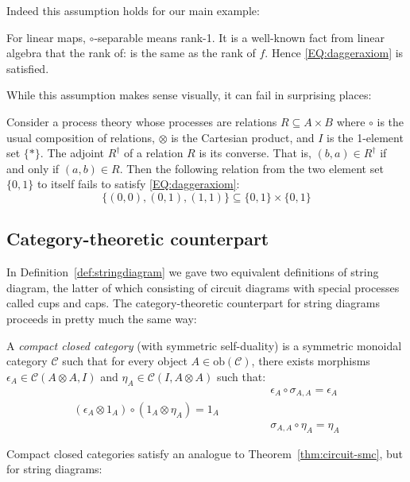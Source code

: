 \documentclass[12pt]{article}
\begin{document}
Indeed this assumption holds for our main example:
\begin{example}
  For linear maps, $\circ$-separable means rank-1. It is a well-known fact from linear algebra that the rank of:
  is the same as the rank of $f$. Hence \eqref{EQ:daggeraxiom} is satisfied.
\end{example}

While this assumption makes sense visually, it can fail in surprising places:
\begin{example}
  Consider a process theory whose processes are relations $R \subseteq A \times B$ where $\circ$ is the usual composition of relations, $\otimes$ is the Cartesian product, and $I$ is the 1-element set $\{ * \}$. The adjoint $R^\dagger$ of a relation $R$ is its converse. That is, $(b,a) \in R^\dagger$ if and only if $(a,b) \in R$. Then the following relation from the two element set $\{0,1\}$ to itself fails to satisfy \eqref{EQ:daggeraxiom}:
  \[ 
  \{ (0,0), (0,1), (1,1) \} \subseteq \{0,1\} \times \{0,1\} 
  \]
\end{example}

\subsection{Category-theoretic counterpart}

In Definition~\ref{def:stringdiagram} we gave two equivalent definitions 
of string diagram, the latter of which consisting of circuit diagrams with special processes called cups and caps. The category-theoretic counterpart for string diagrams proceeds in pretty much the same way:

\begin{definition}\label{def:compact-closed}
  A \textit{compact closed category} (with symmetric self-duality) is a symmetric monoidal category $\mathcal C$ such that for every object $A \in \textrm{ob}(\mathcal C)$, there exists morphisms $\epsilon_A \in \mathcal C(A \otimes A, I)$ and $\eta_A \in \mathcal C(I, A \otimes A)$ such that:  
\[ 
\begin{array}{ccc}
& &  \epsilon_A \circ \sigma_{A,A} = \epsilon_A\\
(\epsilon_A \otimes 1_A) \circ (1_A \otimes \eta_A) = 1_A & \qquad\quad & \\
& & \sigma_{A,A} \circ \eta_A = \eta_A
\end{array}
  \]
\end{definition}

Compact closed categories satisfy an analogue to Theorem~\ref{thm:circuit-smc}, but for string diagrams:
\end{document}
